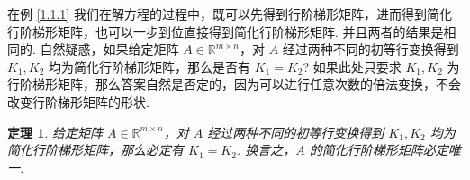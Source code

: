 \documentclass[10pt,openany]{article}
\theoremstyle{thmstyle} %
\newtheorem{theorem}{定理}[subsection]
\theoremstyle{defstyle} %
\theoremstyle{prostyle} %
\theoremstyle{exastyle}
\theoremstyle{remstyle}
\begin{document}
在例 \ref{1.1.1} 我们在解方程的过程中，既可以先得到行阶梯形矩阵，进而得到简化行阶梯形矩阵，也可以一步到位直接得到简化行阶梯形矩阵. 并且两者的结果是相同的. 自然疑惑，如果给定矩阵 \( A \in \mathbb{R}^{m \times n} \)，对 \( A \) 经过两种不同的初等行变换得到 \( K_1, K_2 \) 均为简化行阶梯形矩阵，那么是否有 \( K_1 = K_2 \)? 如果此处只要求 \( K_1, K_2 \) 为行阶梯形矩阵，那么答案自然是否定的，因为可以进行任意次数的倍法变换，不会改变行阶梯形矩阵的形状. 

\begin{theorem}	\label{1.1.9}
	给定矩阵 \( A \in \mathbb{R}^{m \times n} \)，对 \( A \) 经过两种不同的初等行变换得到 \( K_1, K_2 \) 均为简化行阶梯形矩阵，那么必定有 \( K_1=K_2 \). 换言之，\( A \) 的简化行阶梯形矩阵必定唯一. 

\end{theorem}
\end{document}

